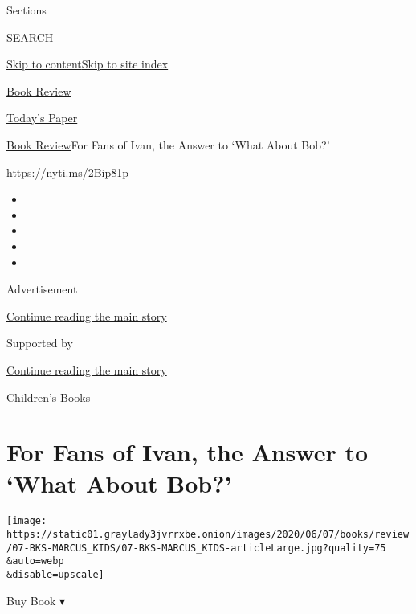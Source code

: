 Sections

SEARCH

\protect\hyperlink{site-content}{Skip to
content}\protect\hyperlink{site-index}{Skip to site index}

\href{https://www.nytimes3xbfgragh.onion/section/books/review}{Book
Review}

\href{https://myaccount.nytimes3xbfgragh.onion/auth/login?response_type=cookie\&client_id=vi}{}

\href{https://www.nytimes3xbfgragh.onion/section/todayspaper}{Today's
Paper}

\href{/section/books/review}{Book Review}\textbar{}For Fans of Ivan, the
Answer to `What About Bob?'

\url{https://nyti.ms/2Bip81p}

\begin{itemize}
\item
\item
\item
\item
\item
\end{itemize}

Advertisement

\protect\hyperlink{after-top}{Continue reading the main story}

Supported by

\protect\hyperlink{after-sponsor}{Continue reading the main story}

\href{/column/childrens-books}{Children's Books}

\hypertarget{for-fans-of-ivan-the-answer-to-what-about-bob}{%
\section{For Fans of Ivan, the Answer to `What About
Bob?'}\label{for-fans-of-ivan-the-answer-to-what-about-bob}}

\texttt{[image: https://static01.graylady3jvrrxbe.onion/images/2020/06/07/books/review/07-BKS-MARCUS\_KIDS/07-BKS-MARCUS\_KIDS-articleLarge.jpg?quality=75\\\&auto=webp\\\&disable=upscale]}

Buy Book ▾

